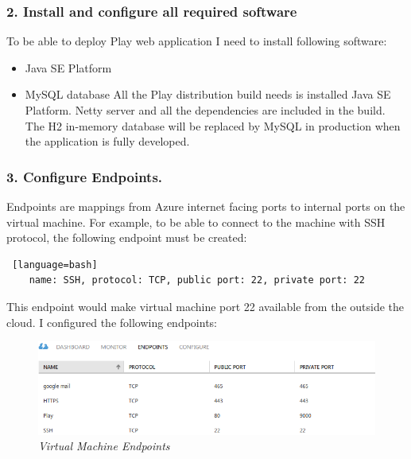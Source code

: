 \documentclass[12pt,twoside,a4paper]{report}
\begin{document}
\subsubsection{2. Install and configure all required software}
To be able to deploy Play web application I need to install following software:
\begin{itemize}\itemsep1pt \parskip0pt 
\item Java SE Platform
\item MySQL database
All the Play distribution build needs is installed Java SE Platform. Netty server and all the dependencies are included in the build. The H2 in-memory database will be replaced by MySQL in production when the application is fully developed.
\end{itemize}

\subsubsection{3. Configure Endpoints.}
Endpoints are mappings from Azure internet facing ports to internal ports on the virtual machine. For example, to be able to connect to the machine with SSH protocol, the following endpoint must be created:
\begin{lstlisting} [language=bash]
	name: SSH, protocol: TCP, public port: 22, private port: 22
\end{lstlisting}
This endpoint would make virtual machine port 22 available from the outside the cloud. I configured the following endpoints:

\begin{figure}[!ht]
	\centering
		\includegraphics[width=1\textwidth, totalheight=4cm]
		{endpoints}
	\caption{\textit{Virtual Machine Endpoints}}
	\label{f4.5.1}
\end{figure}
\end{document}
